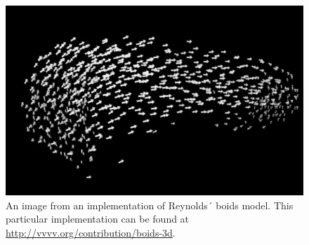 \documentclass[11pt, a4paper]{book}
\begin{document}

\begin{figure}[h!]
\centering
\includegraphics[width=.6\textwidth]{boids.jpg}
\caption{An image from an implementation of Reynolds´ boids model. This particular implementation can be found at \url{http://vvvv.org/contribution/boids-3d}.}
\label{fig:boids}
\end{figure}
\end{document}

